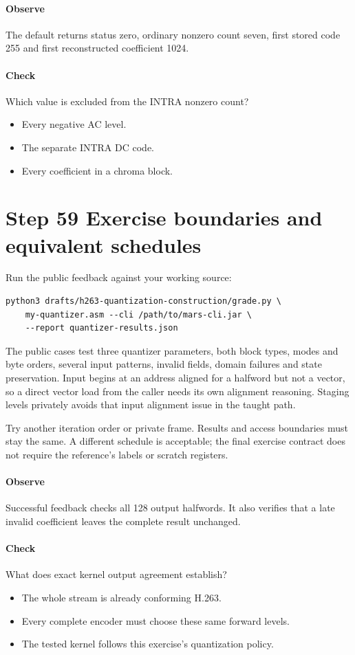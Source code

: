 \paragraph{Observe} The default returns status zero, ordinary nonzero count
seven, first stored code 255 and first reconstructed coefficient 1024.
\paragraph{Check} Which value is excluded from the INTRA nonzero count?
\begin{itemize}
  \item[A.] Every negative AC level.
  \item[B.] The separate INTRA DC code.
  \item[C.] Every coefficient in a chroma block.
\end{itemize}

\section{Step 59 Exercise boundaries and equivalent schedules}\label{h263-quant-s09}
Run the public feedback against your working source:
\begin{verbatim}
python3 drafts/h263-quantization-construction/grade.py \
    my-quantizer.asm --cli /path/to/mars-cli.jar \
    --report quantizer-results.json
\end{verbatim}
The public cases test three quantizer parameters, both block types, modes and
byte orders, several input patterns, invalid fields, domain failures and state
preservation. Input begins at an address aligned for a halfword but not a vector,
so a direct vector load from the caller needs its own alignment reasoning.
Staging levels privately avoids that input alignment issue in the taught path.

Try another iteration order or private frame. Results and access boundaries
must stay the same. A different schedule is acceptable; the final exercise
contract does not require the reference's labels or scratch registers.

\paragraph{Observe} Successful feedback checks all 128 output halfwords. It
also verifies that a late invalid coefficient leaves the complete result unchanged.
\Needspace{8\baselineskip}
\paragraph{Check} What does exact kernel output agreement establish?
\begin{itemize}
  \item[A.] The whole stream is already conforming H.263.
  \item[B.] Every complete encoder must choose these same forward levels.
  \item[C.] The tested kernel follows this exercise's quantization policy.
\end{itemize}

